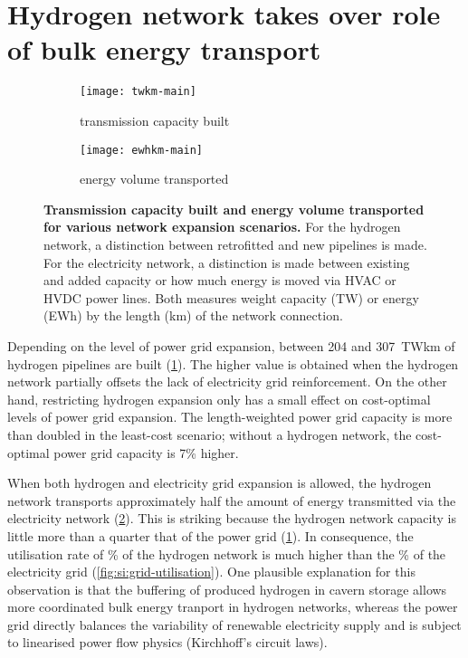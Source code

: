 \section*{Hydrogen network takes over role of bulk energy transport}
\label{sec:energy-moved}

\begin{figure}
    \centering
        \begin{subfigure}[t]{0.49\textwidth}
            \centering
            \caption{transmission capacity built}
            \texttt{[image: twkm-main]}
            \label{fig:network-stats:twkm}
        \end{subfigure}
        \begin{subfigure}[t]{0.49\textwidth}
            \centering
            \caption{energy volume transported}
            \texttt{[image: ewhkm-main]}
            \label{fig:network-stats:ewhkm}
        \end{subfigure}
    \caption{\textbf{Transmission capacity built and energy volume transported for
        various network expansion scenarios.} For the hydrogen network, a
        distinction between retrofitted and new pipelines is made. For the
        electricity network, a distinction is made between existing and added
        capacity or how much energy is moved via HVAC or HVDC power lines. Both
        measures weight capacity (TW) or energy (EWh) by the length (km) of the
        network connection.}
    \label{fig:network-stats}
\end{figure}

Depending on the level of power grid expansion, between 204 and 307~TWkm of
hydrogen pipelines are built (\cref{fig:network-stats:twkm}). The higher value
is obtained when the hydrogen network partially offsets the lack of electricity
grid reinforcement. On the other hand, restricting hydrogen expansion only has a
small effect on cost-optimal levels of power grid expansion. The length-weighted
power grid capacity is more than doubled in the least-cost scenario; without a
hydrogen network, the cost-optimal power grid capacity is 7\% higher.

When both hydrogen and electricity grid expansion is allowed, the hydrogen
network transports approximately half the amount of energy transmitted via the
electricity network (\cref{fig:network-stats:ewhkm}). This is striking because
the hydrogen network capacity is little more than a quarter that of the power
grid (\cref{fig:network-stats:twkm}). In consequence, the utilisation rate of
\utilisationHy\% of the hydrogen network is much higher than the
\utilisationAC\% of the electricity grid (\cref{fig:si:grid-utilisation}). One
plausible explanation for this observation is that the buffering of produced
hydrogen in cavern storage allows more coordinated bulk energy tranport in
hydrogen networks, whereas the power grid directly balances the variability of
renewable electricity supply and is subject to linearised power flow physics
(Kirchhoff's circuit laws).

